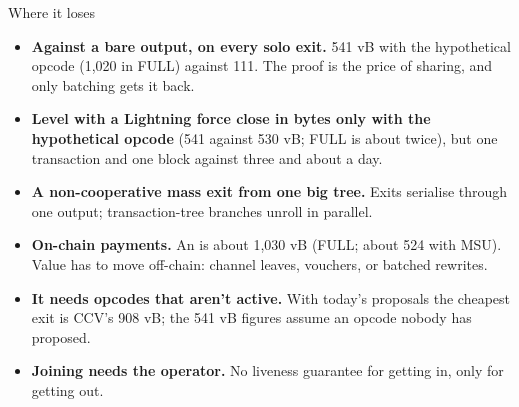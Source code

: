 \documentclass[aspectratio=169,10pt]{beamer}
\begin{document}
\begin{frame}{Where it loses}
  \begin{itemize}
    \item \textbf{Against a bare output, on every solo exit.} 541 vB with the hypothetical opcode (1,020 in FULL) against 111. The proof is the price of sharing, and only batching gets it back.
    \item \textbf{Level with a Lightning force close in bytes only with the hypothetical opcode} (541 against 530 vB; FULL is about twice), but one transaction and one block against three and about a day.
    \item \textbf{A non-cooperative mass exit from one big tree.} Exits serialise through one output; transaction-tree branches unroll in parallel.
    \item \textbf{On-chain payments.} An  is about 1,030 vB (FULL; about 524 with MSU). Value has to move off-chain: channel leaves, vouchers, or batched rewrites.
    \item \textbf{It needs opcodes that aren't active.} With today's proposals the cheapest exit is CCV's 908 vB; the 541 vB figures assume an opcode nobody has proposed.
    \item \textbf{Joining needs the operator.} No liveness guarantee for getting in, only for getting out.
  \end{itemize}
\end{frame}
\end{document}
